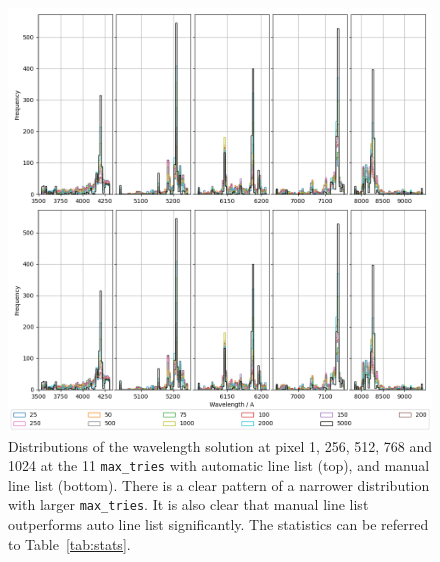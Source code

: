 \documentclass{aa}
\begin{document}
\begin{figure}[h]
    \centering
    \includegraphics[width=\textwidth]{figure_5_wavelengths.png}
    \caption{Distributions of the wavelength solution at pixel 1, 256, 512, 768 and 1024 at the 11 \texttt{max\_tries} with automatic line list (top), and manual line list (bottom). There is a clear pattern of a narrower distribution with larger \texttt{max\_tries}. It is also clear that manual line list outperforms auto line list significantly. The statistics can be referred to Table~\ref{tab:stats}.}
    \label{fig:wavelengths}
\end{figure}
\end{document}
